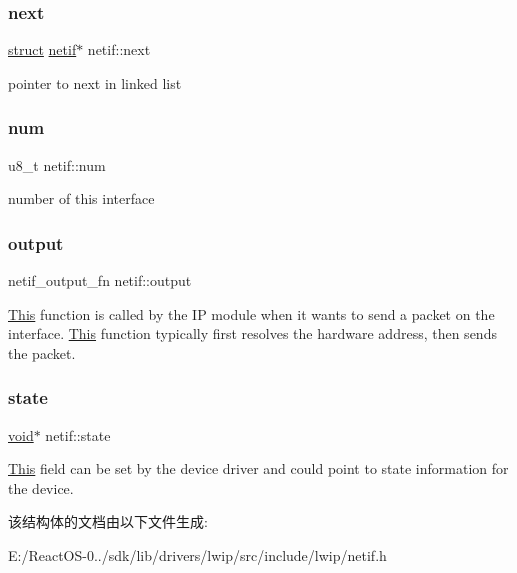 \subsubsection{\texorpdfstring{next}{next}}
{\footnotesize\ttfamily \hyperlink{interfacestruct}{struct} \hyperlink{structnetif}{netif}$\ast$ netif\+::next}

pointer to next in linked list \mbox{\label{structnetif_ab7ef01e505dd2feb781fe86756b1c973}} 
\subsubsection{\texorpdfstring{num}{num}}
{\footnotesize\ttfamily u8\+\_\+t netif\+::num}

number of this interface \mbox{\label{structnetif_a8e1dcfe65db487feecd244355f39215e}} 
\subsubsection{\texorpdfstring{output}{output}}
{\footnotesize\ttfamily netif\+\_\+output\+\_\+fn netif\+::output}

\hyperlink{namespace_this}{This} function is called by the IP module when it wants to send a packet on the interface. \hyperlink{namespace_this}{This} function typically first resolves the hardware address, then sends the packet. \mbox{\label{structnetif_a809cc57c0dff09c5c9ae45b02c2002f3}} 
\subsubsection{\texorpdfstring{state}{state}}
{\footnotesize\ttfamily \hyperlink{interfacevoid}{void}$\ast$ netif\+::state}

\hyperlink{namespace_this}{This} field can be set by the device driver and could point to state information for the device. 

该结构体的文档由以下文件生成\+:\begin{DoxyCompactItemize}
\item 
E\+:/\+React\+O\+S-\/0../sdk/lib/drivers/lwip/src/include/lwip/netif.\+h\end{DoxyCompactItemize}
